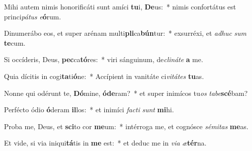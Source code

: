 \item Mihi autem nimis honorificáti sunt amíci \textbf{tu}i, \textbf{De}us:~* nimis confortátus est princi\textit{pá}\textit{tus} \textit{e}\textbf{ó}rum.
\item Dinumerábo eos, et super arénam multi\textbf{pli}ca\textbf{bún}tur:~* exsurréxi, et \textit{ad}\textit{huc} \textit{sum} \textbf{te}cum.
\item Si occíderis, Deus, \textbf{pec}ca\textbf{tó}res:~* viri sánguinum, de\textit{cli}\textit{ná}\textit{te} \textbf{a} me.
\item Quia dícitis in cogi\textbf{ta}ti\textbf{ó}ne:~* Accípient in vanitáte ci\textit{vi}\textit{tá}\textit{tes} \textbf{tu}as.
\item Nonne qui odérunt te, \textbf{Dó}mine, \textbf{ó}\textbf{de}ram?~* et super inimícos tu\textit{os} \textit{ta}\textit{be}\textbf{scé}bam?
\item Perfécto ódio \textbf{ó}deram \textbf{il}los:~* et inimíci \textit{fac}\textit{ti} \textit{sunt} \textbf{mi}hi.
\item Proba me, Deus, et \textbf{sci}to cor \textbf{me}um:~* intérroga me, et cognósce \textit{sé}\textit{mi}\textit{tas} \textbf{me}as.
\item Et vide, si via iniqui\textbf{tá}tis in \textbf{me} est:~* et deduc me in \textit{vi}\textit{a} \textit{æ}\textbf{tér}na.
